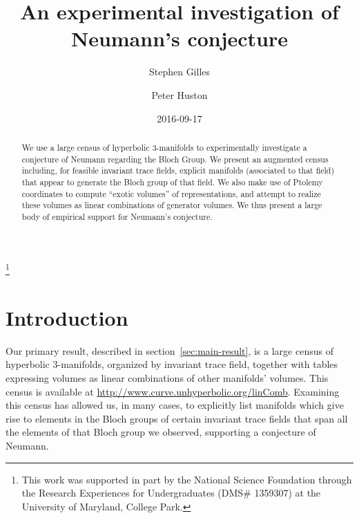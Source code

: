 \documentclass[10pt]{amsart}
\numberwithin{equation}{theorem}
\theoremstyle{definition}
\begin{document}
\title[Investigation of Neumann's Conjecture]{An experimental
  investigation of Neumann's conjecture}

\author[Gilles]{Stephen Gilles} \address{Mathematics Department \\
  University of Maryland \\ 4176 Campus Dr. \\ College Park, MD 20742}


\author[Huston]{Peter Huston}

\thanks{This work was supported in part by the National Science
  Foundation through the Research Experiences for Undergraduates
  (DMS\# 1359307) at the University of Maryland, College Park.}

\date{2016-09-17}


\begin{abstract}
  We use a large census of hyperbolic 3-manifolds to experimentally
  investigate a conjecture of Neumann regarding the Bloch Group. We
  present an augmented census including, for feasible invariant trace
  fields, explicit manifolds (associated to that field) that appear to
  generate the Bloch group of that field. We also make use of Ptolemy
  coordinates to compute ``exotic volumes'' of representations, and
  attempt to realize these volumes as linear combinations of generator
  volumes.  We thus present a large body of empirical support for
  Neumann's conjecture.
\end{abstract}

\maketitle

\tableofcontents

\section{Introduction}

Our primary result, described in section~\ref{sec:main-result}, is
a large census of hyperbolic 3-manifolds, organized by invariant
trace field, together with tables expressing volumes as linear
combinations of other manifolds' volumes. This census is available at
\url{http://www.curve.unhyperbolic.org/linComb}.  Examining this census
has allowed us, in many cases, to explicitly list manifolds which give
rise to elements in the Bloch groups of certain invariant trace fields
that span all the elements of that Bloch group we observed, supporting
a conjecture of Neumann.
\end{document}
